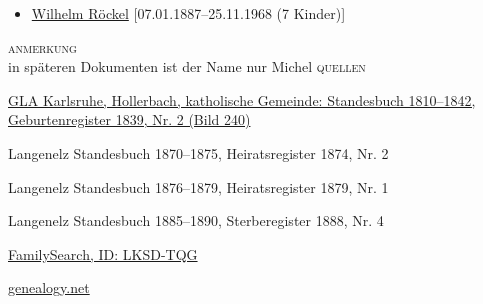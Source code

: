 \begin{person}[
    surname = {Röckel},
    givenname = {Joseph Michael},
    suffix = {1839--1888},
    label = {@I386@}
    ]
\begin{itemize}
\item \hyperref[@I472@]{Wilhelm Röckel} [07.01.1887--25.11.1968 (7 Kinder)]
\end{itemize}
\medbreak
\textsc{anmerkung}\\
in späteren Dokumenten ist der Name nur Michel
\medbreak
\textsc{{quellen}}
\begin{enumerate}[label={[\arabic*]}]
\item \href{http://www.landesarchiv-bw.de/plink/?f=4-1119414-240}{GLA Karlsruhe, Hollerbach, katholische Gemeinde: Standesbuch 1810–1842, Geburtenregister 1839, Nr. 2 (Bild 240)}
\item Langenelz Standesbuch 1870–1875, Heiratsregister 1874, Nr. 2
\item Langenelz Standesbuch 1876–1879, Heiratsregister 1879, Nr. 1
\item Langenelz Standesbuch 1885–1890, Sterberegister 1888, Nr. 4
\item \href{https://www.familysearch.org/tree/person/details/LKSD-TQG}{FamilySearch, ID: LKSD-TQG}
\item \href{http://gedbas.genealogy.net/person/show/1172958280}{genealogy.net}
\end{enumerate}

\end{person}


